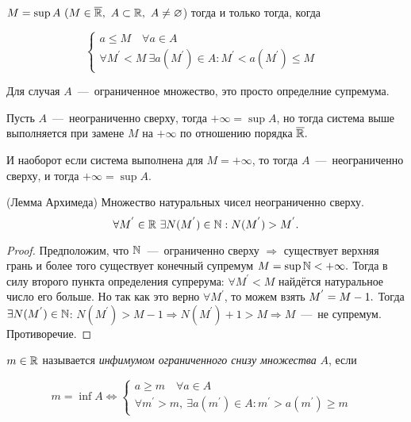     \newpage
    \begin{proposition}
        $M = \sup{A} \text{  } (M \in \overline{\mathbb{R}}, \  A \subset \mathbb{R}, \  A \neq \varnothing$) тогда и только тогда, когда

        \begin{equation*}
            \begin{cases}
                a \leq M \quad \forall a \in A\\
                \forall M^{'} < M \  \exists a(M^{'}) \in A: M^{'} < a(M^{'}) \leq M& 
            \end{cases}
        \end{equation*}

        Для случая $A$~---~ограниченное множество, это просто определние супремума. 
        
        Пусть $A$~---~неограниченно сверху, тогда $+\infty = \sup{A}$, но тогда система выше выполняется при замене $M$ на $+\infty$ по отношению порядка $\overline{\mathbb{R}}.$

        И наоборот если система выполнена для $M = +\infty$, то тогда $A$~---~неограниченно сверху, и тогда $+\infty = \sup{A}.$
    \end{proposition}

    \begin{lemma}
        (Лемма Архимеда) Множество натуральных чисел неограниченно сверху. $$\forall M^{'} \in \mathbb{R} \text{  } \exists N (M^{'}) \in \mathbb{N}: N (M^{'}) > M^{'}.$$
    \end{lemma}
    \begin{proof}
        Предположим, что $\mathbb{N}$~---~ограниченно сверху $\Rightarrow$ существует верхняя грань и более того существует конечный супремум $M = \sup{\mathbb{N}} < +\infty.$ Тогда в силу второго пункта определения супрерума: $\forall M^{'} < M$ найдётся натуральное число его больше. Но так как это верно $\forall M^{'}$, то можем взять $M^{'} = M - 1. \newline$ Тогда $\exists N(M^{'}) \in \mathbb{N}$: $N(M^{'}) > M - 1 \Rightarrow N(M^{'}) + 1 > M \Rightarrow M$~---~не супремум. Противоречие.
    \end{proof}

    \begin{definition}
    \hypertarget{def1.25}{}
        $m \in \mathbb{R}$ называется \textit{инфимумом ограниченного снизу множества} $A$, если

        \begin{equation*}
            m = \inf{A} \Longleftrightarrow
            \begin{cases}
                a \geq m \quad \forall a \in A\\
                \forall m^{'} > m, \  \exists a(m^{'}) \in A: m^{'} > a(m^{'}) \geq m& 
            \end{cases}
        \end{equation*}
    \end{definition}

